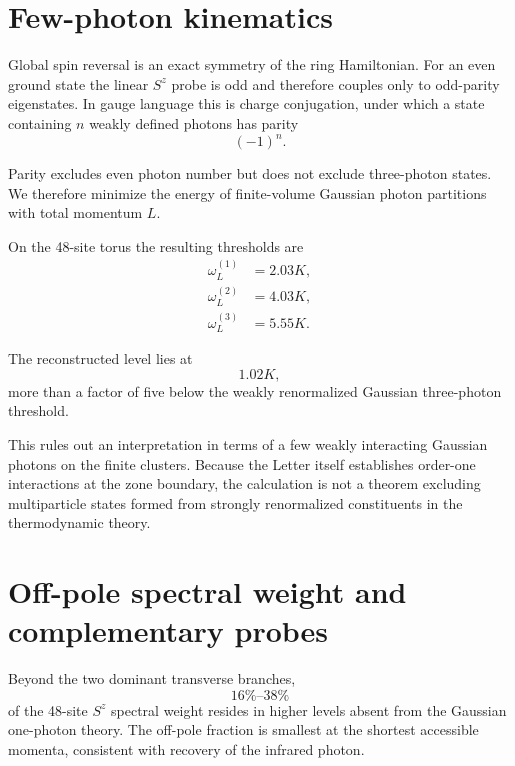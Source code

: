 \documentclass[
aps,
prl,
onecolumn,
amsmath,
amssymb,
superscriptaddress,
longbibliography
]{revtex4-2}
\begin{document}
\section{Few-photon kinematics}
\label{sec:kinematics}

Global spin reversal is an exact symmetry of the ring Hamiltonian.
For an even ground state the linear $S^z$ probe is odd and therefore
couples only to odd-parity eigenstates.
In gauge language this is charge conjugation, under which a state
containing $n$ weakly defined photons has parity
\begin{equation}
(-1)^n .
\end{equation}

Parity excludes even photon number but does not exclude three-photon
states.
We therefore minimize the energy of finite-volume Gaussian photon
partitions with total momentum $L$.

On the 48-site torus the resulting thresholds are
\begin{align}
\omega_L^{(1)}&=2.03K,\\
\omega_L^{(2)}&=4.03K,\\
\omega_L^{(3)}&=5.55K.
\end{align}

The reconstructed level lies at
\begin{equation}
1.02K,
\end{equation}
more than a factor of five below the weakly renormalized Gaussian
three-photon threshold.

This rules out an interpretation in terms of a few weakly interacting
Gaussian photons on the finite clusters.
Because the Letter itself establishes order-one interactions at the
zone boundary, the calculation is not a theorem excluding
multiparticle states formed from strongly renormalized constituents
in the thermodynamic theory.

\section{Off-pole spectral weight and complementary probes}
\label{sec:offpole}

Beyond the two dominant transverse branches,
\begin{equation}
16\%\text{--}38\%
\end{equation}
of the 48-site $S^z$ spectral weight resides in higher levels absent
from the Gaussian one-photon theory.
The off-pole fraction is smallest at the shortest accessible
momenta, consistent with recovery of the infrared photon.
\end{document}

